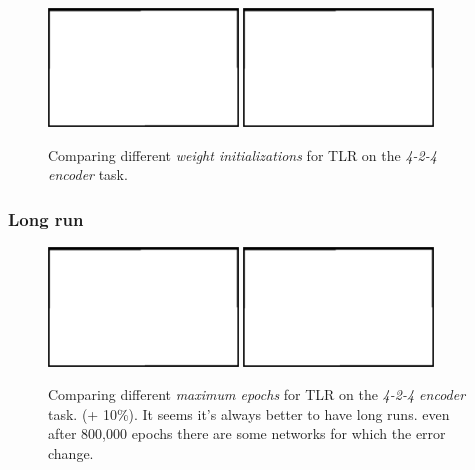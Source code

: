 \begin{figure}[H]
  \centering
  \includegraphics[width=0.45\textwidth]{img/placeholder.png}   
  \includegraphics[width=0.45\textwidth]{img/placeholder.png}    
  \caption{Comparing different \emph{weight initializations} for TLR on the \emph{4-2-4 encoder} task.}
  \label{fig:results-tlr-auto4-sigma}
\end{figure}

\subsubsection{Long run} 
\label{sec:results-long-run} 

\begin{figure}[H]
  \centering
  \includegraphics[width=0.45\textwidth]{img/placeholder.png}   
  \includegraphics[width=0.45\textwidth]{img/placeholder.png}    
  \caption{Comparing different \emph{maximum epochs} for TLR on the \emph{4-2-4 encoder} task. (+ 10\%). It seems it's always better to have long runs. even after 800,000 epochs there are some networks for which the error change.}
  \label{fig:results-tlr-auto4-long-run}
\end{figure}



 
